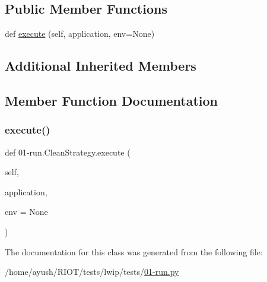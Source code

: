 \subsection*{Public Member Functions}
\begin{DoxyCompactItemize}
\item 
def \hyperlink{class01-run_1_1CleanStrategy_aa4f1b799dc7562ea7971a404348cc905}{execute} (self, application, env=None)
\end{DoxyCompactItemize}
\subsection*{Additional Inherited Members}


\subsection{Member Function Documentation}
\mbox{\label{class01-run_1_1CleanStrategy_aa4f1b799dc7562ea7971a404348cc905}} 
\subsubsection{\texorpdfstring{execute()}{execute()}}
{\footnotesize\ttfamily def 01-\/run.\+Clean\+Strategy.\+execute (\begin{DoxyParamCaption}\item[{}]{self,  }\item[{}]{application,  }\item[{}]{env = {\ttfamily None} }\end{DoxyParamCaption})}



The documentation for this class was generated from the following file\+:\begin{DoxyCompactItemize}
\item 
/home/ayush/\+R\+I\+O\+T/tests/lwip/tests/\hyperlink{lwip_2tests_201-run_8py}{01-\/run.\+py}\end{DoxyCompactItemize}
